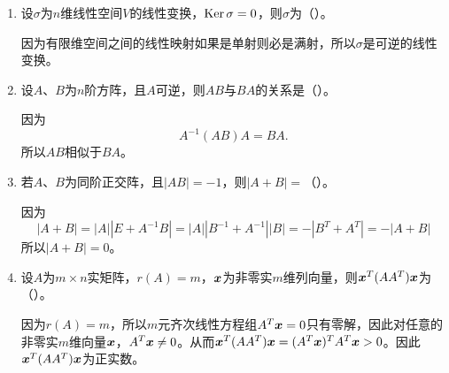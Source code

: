 \begin{enumerate}[1~]
\begin{enumerate}[1.~]
\item
设$\sigma$为$n$维线性空间$V$的线性变换，$\operatorname{Ker}\sigma=0$，则$\sigma$为（\quad）。
\begin{solution}
因为有限维空间之间的线性映射如果是单射则必是满射，所以$\sigma$是可逆的线性变换。
\end{solution}

\item
设$A$、$B$为$n$阶方阵，且$A$可逆，则$AB$与$BA$的关系是（\quad）。
\begin{solution}
因为\[
A^{-1}(AB)A=BA.
\]
所以$AB$相似于$BA$。
\end{solution}

\item
若$A$、$B$为同阶正交阵，且$|AB|=-1$，则$|A+B|=$（\quad）。
\begin{solution}
因为\[
|A+B|=|A||E+A^{-1}B|=|A||B^{-1}+A^{-1}||B|=-|B^T+A^T|=-|A+B|
\]
所以$|A+B|=0$。
\end{solution}

\item
设$A$为$m\times n$实矩阵，${ r}(A)=m$，$\boldsymbol{x}$为非零实$m$维列向量，则$\boldsymbol{x}^T (A A^T)\boldsymbol{x}$为（\quad）。
\begin{solution}
因为$r(A)=m$，所以$m$元齐次线性方程组$A^T \boldsymbol{x}=0$只有零解，因此对任意的非零实$m$维向量$\boldsymbol{x}$，$A^T \boldsymbol{x}\ne0$。从而$\boldsymbol{x}^T (AA^T) \boldsymbol{x}=(A^T \boldsymbol{x})^T A^T \boldsymbol{x}>0$。因此$\boldsymbol{x}^T (A A^T)\boldsymbol{x}$为正实数。
\end{solution}
\end{enumerate}


\end{enumerate}
